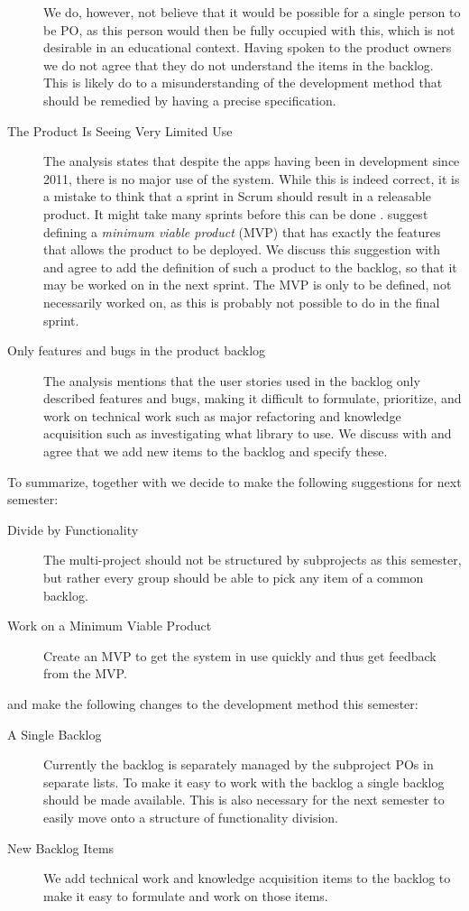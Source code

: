\begin{description}
  We do, however, not believe that it would be possible for a single person to be PO, as this person would then be fully occupied with this, which is not desirable in an educational context. Having spoken to the product owners we do not agree that they do not understand the items in the backlog. This is likely do to a misunderstanding of the development method that should be remedied by having a precise specification.
  \item[The Product Is Seeing Very Limited Use] The analysis states that despite the apps having been in development since 2011, there is no major use of the system. While this is indeed correct, it is a mistake to think that a sprint in Scrum should result in a releasable product. It might take many sprints before this can be done \parencite{larman2003}.  suggest defining a \emph{minimum viable product} (MVP) that has exactly the features that allows the product to be deployed. We discuss this suggestion with  and agree to add the definition of such a product to the backlog, so that it may be worked on in the next sprint. The MVP is only to be defined, not necessarily worked on, as this is probably not possible to do in the final sprint.
  \item[Only features and bugs in the product backlog] The analysis mentions that the user stories used in the backlog only described features and bugs, making it difficult to formulate, prioritize, and work on technical work such as major refactoring and knowledge acquisition such as investigating what library to use. We discuss with  and agree that we add new items to the backlog and specify these.
\end{description}

To summarize, together with  we decide to make the following suggestions for next semester:

\begin{description}
  \item[Divide by Functionality] The multi-project should not be structured by subprojects as this semester, but rather every group should be able to pick any item of a common backlog.
  \item[Work on a Minimum Viable Product] Create an MVP to get the system in use quickly and thus get feedback from the MVP.
\end{description}

and make the following changes to the development method this semester:

\begin{description}
  \item[A Single Backlog] Currently the backlog is separately managed by the subproject POs in separate lists. To make it easy to work with the backlog a single backlog should be made available. This is also necessary for the next semester to easily move onto a structure of functionality division.
  \item[New Backlog Items] We add technical work and knowledge acquisition items to the backlog to make it easy to formulate and work on those items.
\end{description}

